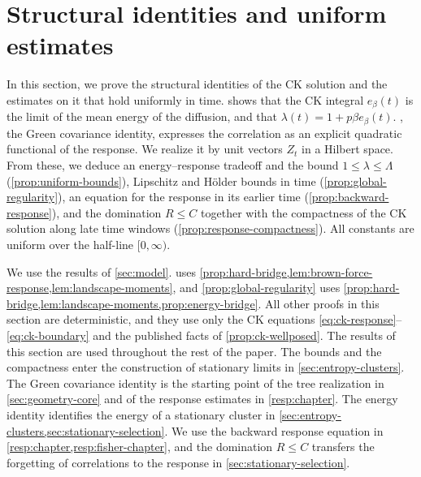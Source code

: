 \chapter{Structural identities and uniform estimates}\label{sec:ck-structure}

In this section, we prove the structural identities of the CK solution and the estimates on it that hold uniformly in time.  shows that the CK integral $e_\beta(t)$ is the limit of the mean energy of the diffusion, and that $\lambda(t)=1+p\beta e_\beta(t)$. , the Green covariance identity, expresses the correlation as an explicit quadratic functional of the response. We realize it by unit vectors $Z_t$ in a Hilbert space. From these, we deduce an energy--response tradeoff and the bound $1\le\lambda\le\Lambda$ (\cref{prop:uniform-bounds}), Lipschitz and H\"older bounds in time (\cref{prop:global-regularity}), an equation for the response in its earlier time (\cref{prop:backward-response}), and the domination $R\le C$ together with the compactness of the CK solution along late time windows (\cref{prop:response-compactness}). All constants are uniform over the half-line $[0,\infty)$.

We use the results of \cref{sec:model}.  uses \cref{prop:hard-bridge,lem:brown-force-response,lem:landscape-moments}, and \cref{prop:global-regularity} uses \cref{prop:hard-bridge,lem:landscape-moments,prop:energy-bridge}. All other proofs in this section are deterministic, and they use only the CK equations \eqref{eq:ck-response}--\eqref{eq:ck-boundary} and the published facts of \cref{prop:ck-wellposed}. The results of this section are used throughout the rest of the paper. The bounds and the compactness enter the construction of stationary limits in \cref{sec:entropy-clusters}. The Green covariance identity is the starting point of the tree realization in \cref{sec:geometry-core} and of the response estimates in \cref{resp:chapter}. The energy identity identifies the energy of a stationary cluster in \cref{sec:entropy-clusters,sec:stationary-selection}. We use the backward response equation in \cref{resp:chapter,resp:fisher-chapter}, and the domination $R\le C$ transfers the forgetting of correlations to the response in \cref{sec:stationary-selection}.

